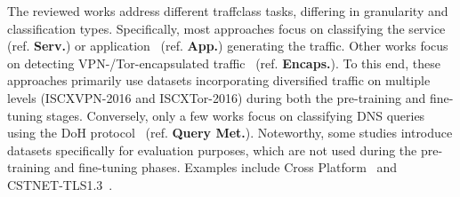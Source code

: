 The reviewed works address different \gls{traffclass} tasks, differing in granularity and classification types.
Specifically, most approaches focus on classifying the 
service~\cite{lin2022,guthula2023netfound,wang2024lens,wang2024netmamba,li2024albert,tao2024lambert} (ref. \textbf{Serv.}) or application~\cite{lin2022,meng2023netgpt,wang2024lens,qu2024trafficgpt,wang2024netmamba,tao2024lambert,li2024albert} (ref. \textbf{App.}) generating the traffic.
Other works focus on detecting VPN-/Tor-encapsulated traffic~\cite{meng2023netgpt,wang2024lens,li2024albert} 
(ref. \textbf{Encaps.}). 
To this end, these approaches primarily use datasets incorporating diversified traffic on multiple levels (\eg ISCXVPN-2016 and ISCXTor-2016) during both the pre-training and fine-tuning stages.
Conversely, only a few works focus on classifying DNS queries using the DoH protocol~\cite{wang2024lens} (ref. \textbf{Query Met.}).
Noteworthy, some studies introduce datasets specifically for evaluation purposes, which are not used during the pre-training and fine-tuning phases. 
%
Examples include Cross Platform~\cite{lin2022, wang2024lens, qu2024trafficgpt,li2024albert} and CSTNET-TLS1.3~\cite{lin2022}.
%






























